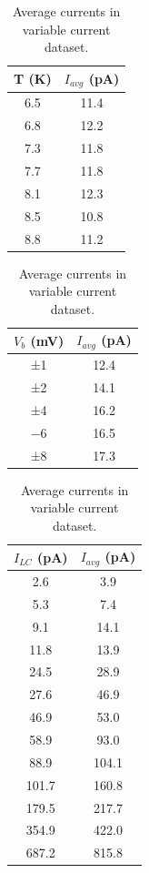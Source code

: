 \documentclass[reprint,amsmath,amssymb,aps,nofootinbib,onecolumn]{revtex4-2}
\begin{document}
\begin{table}[h!]
\parbox{.2\linewidth}{}
\hfill
\parbox[b]{.2\linewidth}{
\centering
\begin{tabular}{|c|c|}
 \hline
 T (K) & $I_{avg}$ (pA) 
 \\ [1ex] 
 \hline 
 \hline 
 6.5 & 11.4 \\
 \hline
 6.8 & 12.2 \\
 \hline
 7.3 & 11.8 \\
 \hline
  7.7 & 11.8 \\
 \hline
  8.1 & 12.3 \\
 \hline
  8.5 & 10.8 \\
 \hline
  8.8 & 11.2 \\
 \hline
\end{tabular}
\caption{Average currents in variable temperature dataset.}
\label{table:temp}
}
\hfill
\parbox[b]{.2\linewidth}{
\centering
\begin{tabular}{|c|c|}
 \hline
 $V_{b}$ (mV) & $I_{avg}$ (pA) 
 \\ [1ex] 
 \hline 
 \hline 
 ±1 & 12.4 \\
 \hline
 ±2 & 14.1 \\
 \hline
 ±4 & 16.2 \\
 \hline
 $-$6 & 16.5 \\
 \hline
  ±8 & 17.3 \\
 \hline
\end{tabular}
\caption{Average currents in variable bias dataset.}
}
\label{table:bias}
\hfill
\parbox[b]{.2\linewidth}{
\centering
\begin{tabular}{|c|c|}
 \hline
 $I_{LC}$ (pA) & $I_{avg}$ (pA) 
 \\ [1ex] 
 \hline 
 \hline 
 2.6 & 3.9 \\
 \hline
 5.3 & 7.4 \\
 \hline
 9.1 & 14.1 \\
 \hline
 11.8 & 13.9 \\
 \hline
 24.5 & 28.9 \\
 \hline
 27.6 & 46.9 \\
 \hline
 46.9 & 53.0 \\
 \hline
 58.9 & 93.0 \\
 \hline
 88.9 & 104.1 \\
 \hline
 101.7 & 160.8 \\
 \hline
 179.5 & 217.7 \\
 \hline 
 354.9 & 422.0 \\
 \hline 
 687.2 & 815.8 \\
 \hline
\end{tabular}
\caption{Average currents in variable current dataset.}
\label{table:curr}
}
\hfill
\parbox{.2\linewidth}{}
\end{table}
\end{document}
